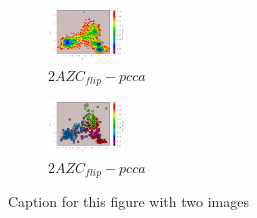 \documentclass[fleqn,10pt]{wlscirep}
\begin{document}
\begin{figure}[!ht]
\centering
\begin{subfigure}{.5\textwidth}
  \centering
  \includegraphics[width=.9\linewidth]{2AZC_flip/2AZC_flip-tica.pdf}
  \caption{$2AZC_{flip}-pcca$}
  \label{sup:2AZC_flip-tica}
\end{subfigure}%
\begin{subfigure}{.5\textwidth}
  \centering
  \includegraphics[width=.9\linewidth]{2AZC_flip/2AZC_flip-pcca.pdf}
  \caption{$2AZC_{flip}-pcca$}
  \label{sup:2AZC_flip-pcca}
\end{subfigure}
\caption{Caption for this figure with two images}
\label{sup:2AZC_flip-cluster}
\end{figure}
\end{document}
